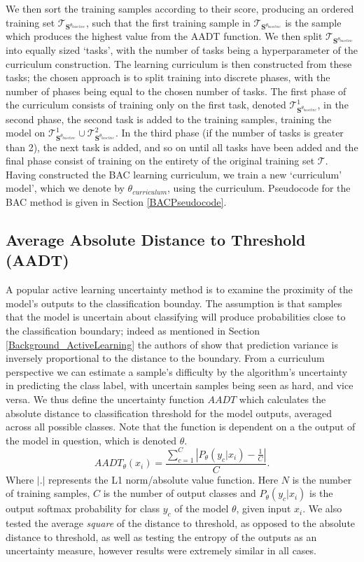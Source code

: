  We then sort the training samples according to their score, producing an ordered training set $\mathcal{T}_{\mathbf{S}^{\theta_{baseline}}}$, such that the first training sample in $\mathcal{T}_{\mathbf{S}^{\theta_{baseline}}}$ is the sample which produces the highest value from the AADT function. We then split $\mathcal{T}_{\mathbf{S}^{\theta_{baseline}}}$ into equally sized `tasks', with the number of tasks being a hyperparameter of the curriculum construction. The learning curriculum is then constructed from these tasks; the chosen approach is to split training into discrete phases, with the number of phases being equal to the chosen number of tasks. The first phase of the curriculum consists of training only on the first task, denoted $\mathcal{T}^1_{\mathbf{S}^{\theta_{baseline}}}$, in the second phase, the second task is added to the training samples, training the model on $\mathcal{T}^1_{\mathbf{S}^{\theta_{baseline}}}\cup\mathcal{T}^2_{\mathbf{S}^{\theta_{baseline}}}$. In the third phase (if the number of tasks is greater than 2), the next task is added, and so on until all tasks have been added and the final phase consist of training on the entirety of the original training set $\mathcal{T}$. Having constructed the BAC learning curriculum, we train a new `curriculum' model', which we denote by $\theta_{curriculum}$, using the curriculum. Pseudocode for the BAC method is given in Section \ref{BACPseudocode}.

\subsection{Average Absolute Distance to Threshold (AADT)}\label{BAC_AADT}
A popular active learning uncertainty method is to examine the proximity of the model's outputs to the classification bounday. The assumption is that samples that the model is uncertain about classifying will produce probabilities close to the classification boundary; indeed as mentioned in Section \ref{Background_ActiveLearning} the authors of \cite{Chang18} show that prediction variance is inversely proportional to the distance to the boundary. From a curriculum perspective we can estimate a sample's difficulty by the algorithm's uncertainty in predicting the class label, with uncertain samples being seen as hard, and vice versa. We thus define the uncertainty function $AADT$ which calculates the absolute distance to classification threshold for the model outputs, averaged across all possible classes. Note that the function is dependent on a the output of the model in question, which is denoted $\theta$.
\begin{equation}
AADT_{\theta}(x_i) = \frac{ \sum_{c=1}^{C} \left|P_{\theta}(y_c |x_i) - \frac{1}{C}\right|}{C}.
\end{equation}
Where $|.|$ represents the L1 norm/absolute value function.
Here $N$ is the number of training samples, $C$ is the number of output classes and $P_{\theta}(y_c |x_i)$ is the output softmax probability for class $y_c$ of the model $\theta$, given input $x_i$. We also tested the average \textit{square} of the distance to threshold, as opposed to the absolute distance to threshold, as well as testing the entropy of the outputs as an uncertainty measure, however results were extremely similar in all cases.

